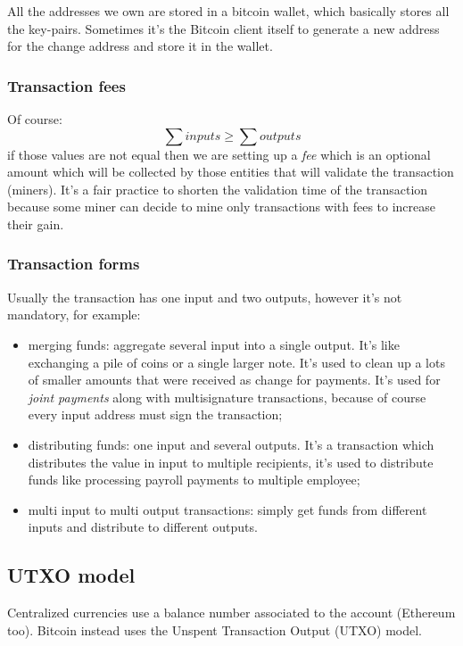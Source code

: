 All the addresses we own are stored in a bitcoin wallet, which basically stores all the key-pairs.
Sometimes it's the Bitcoin client itself to generate a new address for the change address and store it in the wallet.

\subsubsection{Transaction fees}
Of course:
$$
    \sum inputs \geq \sum outputs
$$
if those values are not equal then we are setting up a \emph{fee} which is an optional amount which will be collected by those entities that will validate the transaction (miners).
It's a fair practice to shorten the validation time of the transaction because some miner can decide to mine only transactions with fees to increase their gain.

\subsubsection{Transaction forms}
Usually the transaction has one input and two outputs, however it's not mandatory, for example:
\begin{itemize}
    \item merging funds: aggregate several input into a single output.
    It's like exchanging a pile of coins or a single larger note.
    It's used to clean up a lots of smaller amounts that were received as change for payments.
    It's used for \emph{joint payments} along with multisignature transactions, because of course every input address must sign the transaction;

    \item distributing funds: one input and several outputs.
    It's a transaction which distributes the value in input to multiple recipients, it's used to distribute funds like processing payroll payments to multiple employee;

    \item multi input to multi output transactions: simply get funds from different inputs and distribute to different outputs.    
\end{itemize}

\subsection{UTXO model}
Centralized currencies use a balance number associated to the account (Ethereum too).
Bitcoin instead uses the Unspent Transaction Output (UTXO) model.


